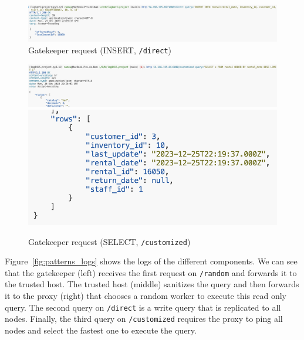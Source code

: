 \documentclass[letterpaper,headings=standardclasses,parskip=half]{scrartcl}
\begin{document}
\begin{figure}[h]
    \centering
    \includegraphics[width=\linewidth]{figures/Screenshot 2023-12-25 at 23.21.17.png}
    \caption{Gatekeeper request (INSERT, \texttt{/direct})}
    \label{fig:patterns_direct}
\end{figure}
\begin{figure}[h]
    \centering
    \includegraphics[width=\linewidth]{figures/Screenshot 2023-12-25 at 23.24.17.png}
    \includegraphics[width=0.75\linewidth]{figures/Screenshot 2023-12-25 at 23.24.23.png}
    \caption{Gatekeeper request (SELECT, \texttt{/customized})}
    \label{fig:patterns_customized}
\end{figure}

Figure~\ref{fig:patterns_logs} shows the logs of the different components. We can see that the gatekeeper (left) receives the first request on \texttt{/random} and forwards it to the trusted host. The trusted host (middle) sanitizes the query and then forwards it to the proxy (right) that chooses a random worker to execute this read only query. The second query on \texttt{/direct} is a write query that is replicated to all nodes. Finally, the third query on \texttt{/customized} requires the proxy to ping all nodes and select the fastest one to execute the query.
\end{document}
